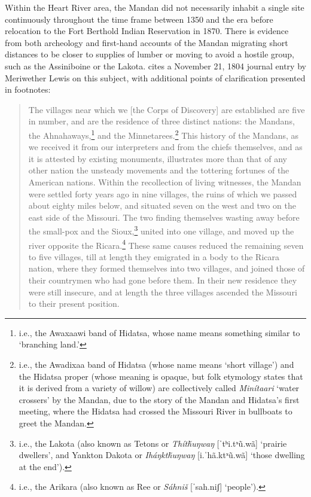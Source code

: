 Within the Heart River area, the Mandan did not necessarily inhabit a single site continuously throughout the time frame between 1350 and the era before relocation to the Fort Berthold Indian Reservation in 1870. There is evidence from both archeology and first-hand accounts of the Mandan migrating short distances to be closer to supplies of lumber or moving to avoid a hostile group, such as the Assiniboine or the Lakota. \citet[104]{allen1814a} cites a November 21, 1804 journal entry by Meriwether Lewis on this subject, with additional points of clarification presented in footnotes:

\begin{quotation}

The villages near which we [the Corps of Discovery] are established are five in number, and are the residence of three distinct nations: the Mandans, the Ahnahaways,\footnote{i.e., the Awaxaawi band of Hidatsa, whose name means something similar to `branching land.'} and the Minnetarees.\footnote{i.e., the Awadixaa band of Hidatsa (whose name means `short village') and the Hidatsa proper (whose meaning is opaque, but folk etymology states that it is derived from a variety of willow) are collectively called \textit{Minítaari} `water crossers' by the Mandan, due to the story of the Mandan and Hidatsa's first meeting, where the Hidatsa had crossed the Missouri River in bullboats to greet the Mandan.} This history of the Mandans, as we received it from our interpreters and from the chiefs themselves, and as it is attested by existing monuments, illustrates more than that of any other nation the unsteady movements and the tottering fortunes of the American nations. Within the recollection of living witnesses, the Mandan were settled forty years ago in nine villages, the ruins of which we passed about eighty miles below, and situated seven on the west and two on the east side of the Missouri. The two finding themselves wasting away before the small-pox and the Sioux,\footnote{i.e., the Lakota (also known as Tetons or \textit{Thítȟuŋwaŋ} [ˈtʰi.tˣũ.wã] `prairie dwellers', and Yankton Dakota or \textit{Iháŋktȟuŋwaŋ} [i.ˈhã.ktˣũ.wã] `those dwelling at the end').} united into one village, and moved up the river opposite the Ricara.\footnote{i.e., the Arikara (also known as Ree or \textit{Sáhniš} [ˈsah.niʃ] `people').} These same causes reduced the remaining seven to five villages, till at length they emigrated in a body to the Ricara nation, where they formed themselves into two villages, and joined those of their countrymen who had gone before them. In their new residence they were still insecure, and at length the three villages ascended the Missouri to their present position.

\end{quotation}

